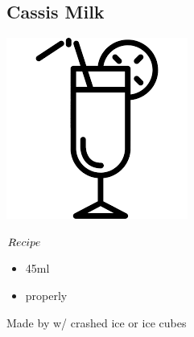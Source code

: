 \subsection{Cassis Milk}
\vspace{-7mm}
\hspace{38mm}
\includegraphics[scale=.07]{cocktail_glass_tall.png}
\vspace{2.5mm}
\begin{itembox}[l]{\boldmath $Recipe$}
\begin{itemize}
\setlength{\parskip}{0cm}
\setlength{\itemsep}{0cm}
\item \cc 45ml
\item \milk properly
\end{itemize}
\vspace{-4mm}
Made by \build w/ crashed ice or ice cubes
\end{itembox}
